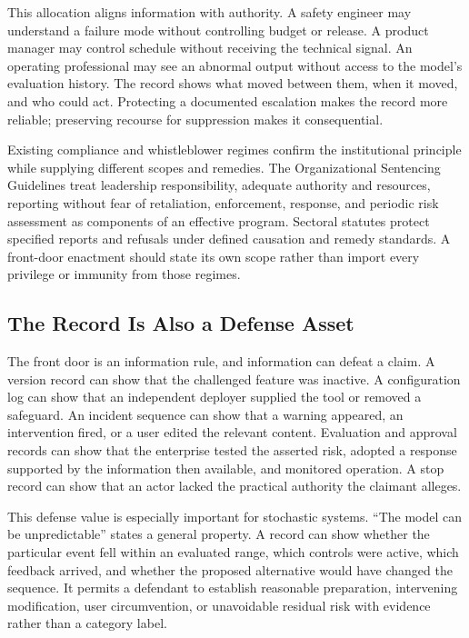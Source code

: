This allocation aligns information with authority. A safety engineer may understand a failure mode without controlling budget or release. A product manager may control schedule without receiving the technical signal. An operating professional may see an abnormal output without access to the model's evaluation history. The record shows what moved between them, when it moved, and who could act. Protecting a documented escalation makes the record more reliable; preserving recourse for suppression makes it consequential.

Existing compliance and whistleblower regimes confirm the institutional principle while supplying different scopes and remedies. The Organizational Sentencing Guidelines treat leadership responsibility, adequate authority and resources, reporting without fear of retaliation, enforcement, response, and periodic risk assessment as components of an effective program. Sectoral statutes protect specified reports and refusals under defined causation and remedy standards. A front-door enactment should state its own scope rather than import every privilege or immunity from those regimes.

\subsection{The Record Is Also a Defense Asset}

The front door is an information rule, and information can defeat a claim. A version record can show that the challenged feature was inactive. A configuration log can show that an independent deployer supplied the tool or removed a safeguard. An incident sequence can show that a warning appeared, an intervention fired, or a user edited the relevant content. Evaluation and approval records can show that the enterprise tested the asserted risk, adopted a response supported by the information then available, and monitored operation. A stop record can show that an actor lacked the practical authority the claimant alleges.

This defense value is especially important for stochastic systems. ``The model can be unpredictable'' states a general property. A record can show whether the particular event fell within an evaluated range, which controls were active, which feedback arrived, and whether the proposed alternative would have changed the sequence. It permits a defendant to establish reasonable preparation, intervening modification, user circumvention, or unavoidable residual risk with evidence rather than a category label.


